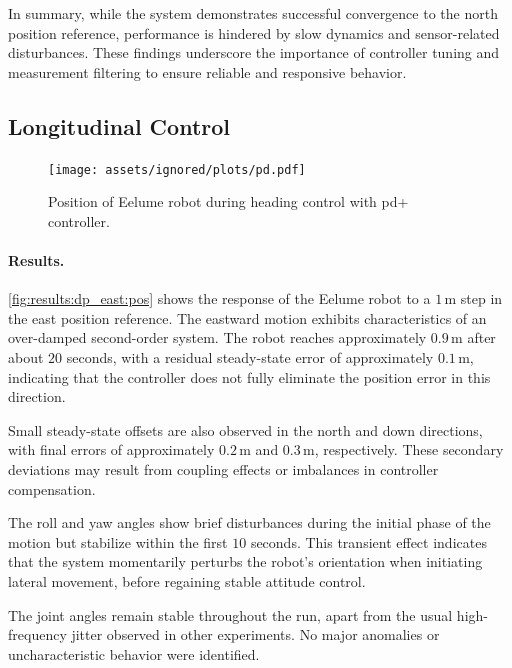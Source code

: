 In summary, while the system demonstrates successful convergence to the north position reference, performance is hindered by slow dynamics and sensor-related disturbances. These findings underscore the importance of controller tuning and measurement filtering to ensure reliable and responsive behavior.

\FloatBarrier

\subsection{Longitudinal Control}
\begin{figure}[!ht]
    \centering
    \texttt{[image: assets/ignored/plots/pd.pdf]}
    \caption{Position of Eelume robot during heading control with \gls{pd+} controller.}
    \label{fig:results:dp_east:pos}
\end{figure}

\paragraph{Results.}

\autoref{fig:results:dp_east:pos} shows the response of the Eelume robot to a 
\(1\,\mathrm{m}\) step in the east position reference. The eastward motion 
exhibits characteristics of an over-damped second-order system. The robot 
reaches approximately \(0.9\,\mathrm{m}\) after about \(20\) seconds, with a 
residual steady-state error of approximately \(0.1\,\mathrm{m}\), indicating 
that the controller does not fully eliminate the position error in this 
direction.

Small steady-state offsets are also observed in the north and down directions, 
with final errors of approximately \(0.2\,\mathrm{m}\) and \(0.3\,\mathrm{m}\),
respectively. These secondary deviations may result from coupling effects 
or imbalances in controller compensation.

The roll and yaw angles show brief disturbances during the initial phase of 
the motion but stabilize within the first \(10\) seconds. This transient 
effect indicates that the system momentarily perturbs the robot’s orientation 
when initiating lateral movement, before regaining stable attitude control.

The joint angles remain stable throughout the run, apart from the usual high-
frequency jitter observed in other experiments. No major anomalies or 
uncharacteristic behavior were identified.

